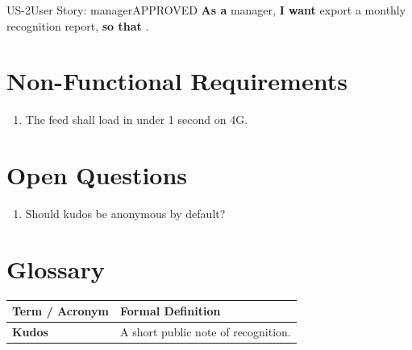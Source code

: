 \documentclass[11pt,a4paper]{article}
\begin{document}
\begin{requirementbox}{US-2}{User Story: manager}{APPROVED}
\textbf{As a} manager, \textbf{I want} export a monthly recognition report, \textbf{so that} .
\end{requirementbox}

\section{Non-Functional Requirements}
\begin{enumerate}[leftmargin=*]
    \item The feed shall load in under 1 second on 4G.
\end{enumerate}

\section{Open Questions}
\begin{enumerate}[leftmargin=*]
    \item Should kudos be anonymous by default?
\end{enumerate}

\section{Glossary}
\begin{table}[h!]
\centering
\begin{tabularx}{\linewidth}{l X}
\toprule
\textbf{Term / Acronym} & \textbf{Formal Definition} \\
\midrule
\textbf{Kudos} & A short public note of recognition. \\
\bottomrule
\end{tabularx}
\end{table}
\end{document}
